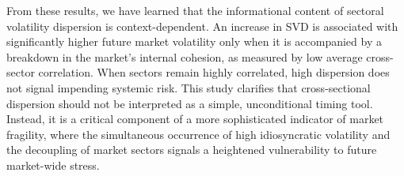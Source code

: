 \documentclass[]{article}
\begin{document}
From these results, we have learned that the informational content of sectoral volatility dispersion is context-dependent. An increase in SVD is associated with significantly higher future market volatility only when it is accompanied by a breakdown in the market's internal cohesion, as measured by low average cross-sector correlation. When sectors remain highly correlated, high dispersion does not signal impending systemic risk. This study clarifies that cross-sectional dispersion should not be interpreted as a simple, unconditional timing tool. Instead, it is a critical component of a more sophisticated indicator of market fragility, where the simultaneous occurrence of high idiosyncratic volatility and the decoupling of market sectors signals a heightened vulnerability to future market-wide stress.


{}

\end{document}
